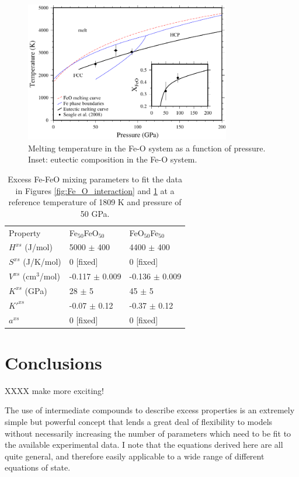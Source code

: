 \documentclass[review]{elsarticle}
\begin{document}
\begin{figure}[ht!]
  \centering
  \includegraphics[width=0.8\textwidth]{figures/Fe_FeO_T_X_eutectic}
  \caption{Melting temperature in the Fe-O system as a function of pressure. Inset: eutectic composition in the Fe-O system.}
  \label{fig:Fe_O_melting}
\end{figure}

\begin{table}[ht!]
\centering
\caption{Excess Fe-FeO mixing parameters to fit the data in Figures \ref{fig:Fe_O_interaction} and \ref{fig:Fe_O_melting} at a reference temperature of 1809 K and pressure of 50 GPa.}
\label{tab:Fe_FeO}
\begin{tabular}{lll}
  Property        & Fe$_{50}$FeO$_{50}$  & FeO$_{50}$Fe$_{50}$ \\
  $H^{xs}$ (J/mol) &  5000 $\pm$ 400 & 4400 $\pm$ 400  \\
  $S^{xs}$ (J/K/mol)  & 0 [fixed] & 0 [fixed] \\
  $V^{xs}$ (cm$^3$/mol)   & -0.117 $\pm$ 0.009 &  -0.136 $\pm$ 0.009 \\
  $K^{xs}$  (GPa)  & 28 $\pm$ 5 & 45 $\pm$ 5  \\
  $K'^{xs}$   & -0.07 $\pm$ 0.12 & -0.37 $\pm$ 0.12  \\
  $a^{xs}$   & 0 [fixed] & 0 [fixed]  
\end{tabular}
\end{table}

\clearpage
\section{Conclusions}
XXXX make more exciting!

The use of intermediate compounds to describe excess properties is an extremely simple but powerful concept that lends a great deal of flexibility to models without necessarily increasing the number of parameters which need to be fit to the available experimental data. I note that the equations derived here are all quite general, and therefore easily applicable to a wide range of different equations of state.
\end{document}
